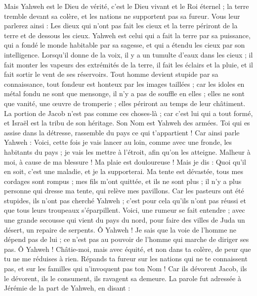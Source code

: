 \begin{multicols}{2}
Mais Yahweh est le Dieu de vérité, c'est le Dieu vivant et le Roi éternel ; la terre tremble devant sa colère, et les nations ne supportent pas sa fureur.
Vous leur parlerez ainsi : Les dieux qui n'ont pas fait les cieux et la terre périront de la terre et de dessous les cieux.
Yahweh est celui qui a fait la terre par sa puissance, qui a fondé le monde habitable par sa sagesse, et qui a étendu les cieux par son intelligence.
Lorsqu'il donne de la voix, il y a un tumulte d'eaux dans les cieux ; il fait monter les vapeurs des extrémités de la terre, il fait les éclairs et la pluie, et il fait sortir le vent de ses réservoirs.
Tout homme devient stupide par sa connaissance, tout fondeur est honteux par les images taillées ; car les idoles en métal fondu ne sont que mensonge, il n'y a pas de souffle en elles ;
elles ne sont que vanité, une œuvre de tromperie ; elles périront au temps de leur châtiment.
La portion de Jacob n'est pas comme ces choses-là ; car c'est lui qui a tout formé, et Israël est la tribu de son héritage. Son Nom est Yahweh des armées.
Toi qui es assise dans la détresse, rassemble du pays ce qui t'appartient !
Car ainsi parle Yahweh : Voici, cette fois je vais lancer au loin, comme avec une fronde, les habitants du pays ; je vais les mettre à l'étroit, afin qu'on les atteigne.
Malheur à moi, à cause de ma blessure ! Ma plaie est douloureuse ! Mais je dis : Quoi qu'il en soit, c'est une maladie, et je la supporterai.
Ma tente est dévastée, tous mes cordages sont rompus ; mes fils m'ont quittée, et ils ne sont plus ; il n'y a plus personne qui dresse ma tente, qui relève mes pavillons.
Car les pasteurs ont été stupides, ils n'ont pas cherché Yahweh ; c'est pour cela qu'ils n'ont pas réussi et que tous leurs troupeaux s'éparpillent.
Voici, une rumeur se fait entendre ; avec une grande secousse qui vient du pays du nord, pour faire des villes de Juda un désert, un repaire de serpents.
Ô Yahweh ! Je sais que la voie de l'homme ne dépend pas de lui ; ce n'est pas au pouvoir de l'homme qui marche de diriger ses pas.
Ô Yahweh ! Châtie-moi, mais avec équité, et non dans ta colère, de peur que tu ne me réduises à rien.
Répands ta fureur sur les nations qui ne te connaissent pas, et sur les familles qui n'invoquent pas ton Nom ! Car ils dévorent Jacob, ils le dévorent, ils le consument, ils ravagent sa demeure.
\VerseOne{}La parole fut adressée à Jérémie de la part de Yahweh, en disant :

\end{multicols}
